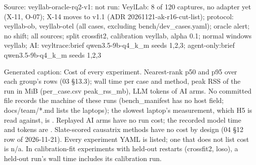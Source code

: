 \noindent Source: veyllab-oracle-rq2-v1: not run: VeylLab: 8 of 120 captures, no adapter yet (X-11, O-07); X-14 moves to v1.1 (ADR 20261121-ak-r16-cut-list); protocol: veyllab-ob, veyllab-otel (all cases, excluding bench/\allowbreak{}dev\_cases.yaml); oracle alert; no shift; all sources; split crossfit2, calibration veyllab, alpha 0.1; normal windows veyllab; AI: veyltrace:brief qwen3.5-9b-q4\_k\_m seeds 1,2,3; agent-only:brief qwen3.5-9b-q4\_k\_m seeds 1,2,3\par
\noindent Generated caption: Cost of every experiment. Nearest-rank p50 and p95 over each group's rows (03 \S{}13.3); wall time per case and method, peak RSS of the run in MiB (per\_case.csv peak\_rss\_mb), LLM tokens of AI arms. No committed file records the machine of these runs (bench\_manifest has no host field; docs/\allowbreak{}team/\allowbreak{}*.md lists the laptops); the slowest laptop's measurement, which H5 is read against, is . Replayed AI arms have no run cost; the recorded model time and tokens are . Slate-scored causatrix methods have no cost by design (04 \S{}12 row of 2026-11-21). Every experiment YAML is listed; one that does not list cost is n/\allowbreak{}a. In calibration-fit experiments with held-out restarts (crossfit2, loso), a held-out run's wall time includes its calibration run.\par
\endgroup

